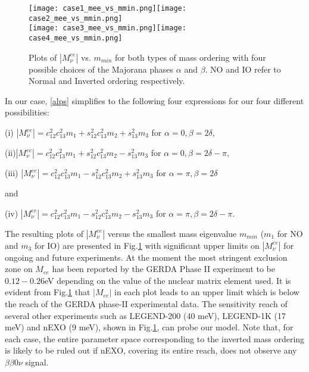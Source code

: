 \documentclass[11pt]{article}
\begin{document}
\begin{figure}[H]
\texttt{[image: case1\_mee\_vs\_mmin.png]}\texttt{[image: case2\_mee\_vs\_mmin.png]}\\

\texttt{[image: case3\_mee\_vs\_mmin.png]}\texttt{[image: case4\_mee\_vs\_mmin.png]}

\caption{Plots of $|M^{ee}_\nu|$ vs. $m_{min}$ for both types of mass ordering with four possible choices of the Majorana phases $\alpha$ and $\beta$. NO and IO refer to Normal and Inverted ordering respectively.}\label{fg5}
\end{figure}
\noindent


In our case, \eqref{alps} simplifies to the following four expressions for our four different possibilities:
\vspace{0.5cm}

(i) $|M^{ee}_\nu|=c^2_{12}c^2_{13}m_1+s^2_{12}c^2_{13}m_2+s^2_{13}m_3$ for $\alpha=0,\beta=2\delta$,

(ii)$|M^{ee}_\nu|=c^2_{12}c^2_{13}m_1+s^2_{12}c^2_{13}m_2-s^2_{13}m_3$ for  $\alpha=0,\beta=2\delta-\pi$,

(iii) $|M^{ee}_\nu|=c^2_{12}c^2_{13}m_1-s^2_{12}c^2_{13}m_2+s^2_{13}m_3$ for $\alpha=\pi,\beta=2\delta$

and 

(iv) $|M^{ee}_\nu|=c^2_{12}c^2_{13}m_1-s^2_{12}c^2_{13}m_2-s^2_{13}m_3$ for $\alpha=\pi,\beta=2\delta-\pi$.
\noindent

The resulting plots of $|M^{ee}_\nu|$ versus the smallest mass eigenvalue $m_{min}$ ($m_1$ for NO and $m_3$ for IO) are presented in Fig.\ref{fg5} with significant upper limits on $|M^{ee}_\nu|$ for ongoing and future experiments. At the moment the most stringent exclusion zone on $M_{ee}$ has been reported by the GERDA Phase II\cite{gerda2} experiment to be $0.12-0.26$eV depending on the value of the nuclear matrix element used. It is evident from Fig.\ref{fg5} that  $|M_{ee}|$ in each plot leads to an upper limit which is below the reach of the GERDA phase-II experimental data. The sensitivity reach of several other experiments such as LEGEND-200 (40 meV), LEGEND-1K (17 meV) and nEXO (9 meV)\cite{Agostini:2017jim}, shown in Fig.\ref{fg5}, can probe our model. Note that, for each case, the entire parameter space corresponding to the inverted mass ordering is likely to be ruled out if nEXO, covering its entire reach, does not observe any $\beta\beta0\nu$ signal. 
\end{document}
